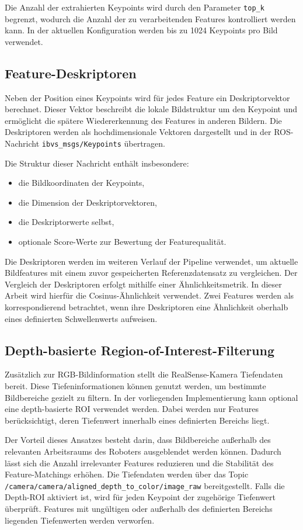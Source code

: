 Die Anzahl der extrahierten Keypoints wird durch den Parameter \texttt{top\_k} begrenzt, wodurch die Anzahl der zu verarbeitenden Features kontrolliert werden kann. In der aktuellen Konfiguration werden bis zu 1024 Keypoints pro Bild verwendet.

\subsection{Feature-Deskriptoren}
\label{subsec:feature_deskriptoren}

Neben der Position eines Keypoints wird für jedes Feature ein Deskriptorvektor berechnet. Dieser Vektor beschreibt die lokale Bildstruktur um den Keypoint und ermöglicht die spätere Wiedererkennung des Features in anderen Bildern. Die Deskriptoren werden als hochdimensionale Vektoren dargestellt und in der ROS-Nachricht \texttt{ibvs\_msgs/Keypoints} übertragen.

Die Struktur dieser Nachricht enthält insbesondere:

\begin{itemize}
	\item die Bildkoordinaten der Keypoints,
	\item die Dimension der Deskriptorvektoren,
	\item die Deskriptorwerte selbst,
	\item optionale Score-Werte zur Bewertung der Featurequalität.
\end{itemize}

Die Deskriptoren werden im weiteren Verlauf der Pipeline verwendet, um aktuelle Bildfeatures mit einem zuvor gespeicherten Referenzdatensatz zu vergleichen. Der Vergleich der Deskriptoren erfolgt mithilfe einer Ähnlichkeitsmetrik. In dieser Arbeit wird hierfür die Cosinus-Ähnlichkeit verwendet. Zwei Features werden als korrespondierend betrachtet, wenn ihre Deskriptoren eine Ähnlichkeit oberhalb eines definierten Schwellenwerts aufweisen.

\subsection{Depth-basierte Region-of-Interest-Filterung}
\label{subsec:depth_roi_filterung}

Zusätzlich zur RGB-Bildinformation stellt die RealSense-Kamera Tiefendaten bereit. Diese Tiefeninformationen können genutzt werden, um bestimmte Bildbereiche gezielt zu filtern. In der vorliegenden Implementierung kann optional eine depth-basierte \ac{ROI} verwendet werden. Dabei werden nur Features berücksichtigt, deren Tiefenwert innerhalb eines definierten Bereichs liegt.

Der Vorteil dieses Ansatzes besteht darin, dass Bildbereiche außerhalb des relevanten Arbeitsraums des Roboters ausgeblendet werden können. Dadurch lässt sich die Anzahl irrelevanter Features reduzieren und die Stabilität des Feature-Matchings erhöhen. Die Tiefendaten werden über das Topic \texttt{/camera/camera/aligned\_depth\_to\_color/image\_raw} bereitgestellt. Falls die Depth-\ac{ROI} aktiviert ist, wird für jeden Keypoint der zugehörige Tiefenwert überprüft. Features mit ungültigen oder außerhalb des definierten Bereichs liegenden Tiefenwerten werden verworfen.

